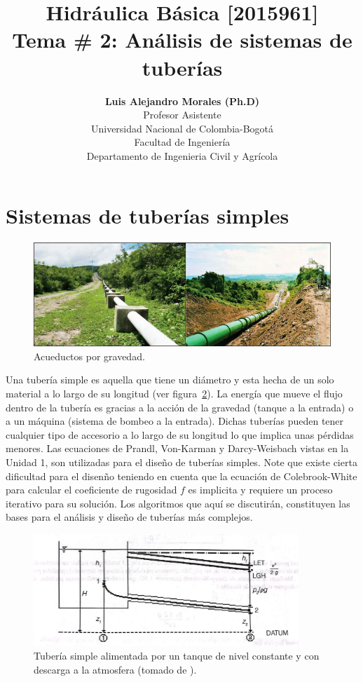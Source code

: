\documentclass[10pt, oneside]{article}
\title{Hidr\'aulica B\'asica [2015961] \\ \textbf{Tema \# 2: An\'alisis de sistemas de tuber\'ias}}
\author{\textbf{Luis Alejandro Morales (Ph.D)}\\ \vspace{0.4cm} Profesor Asistente \\ Universidad Nacional de Colombia-Bogot\'a\\Facultad de Ingenier\'ia \\ Departamento de Ingenieria Civil y Agr\'icola}
\date{}
\begin{document}
\maketitle
\tableofcontents


\section{Sistemas de tuber\'ias simples} \label{tubs}

\begin{figure}[h]
\centering
\includegraphics[width=12cm]{./figs/simpTub.png}
\caption{Acueductos por gravedad.} 
\label{simpTub}
\end{figure}


Una tuber\'ia simple es aquella que tiene un di\'ametro y esta hecha de un solo material a lo largo de su longitud (ver figura~\ref{ttub}). La energ\'ia que mueve el flujo dentro de la tuber\'ia es gracias a la acci\'on de la gravedad (tanque a la entrada) o a un m\'aquina (sistema de bombeo a la entrada). Dichas tuber\'ias pueden tener cualquier tipo de accesorio a lo largo de su longitud lo que implica unas p\'erdidas menores. Las ecuaciones de Prandl, Von-Karman y Darcy-Weisbach vistas en la Unidad 1, son utilizadas para el dise\~no de tuber\'ias simples. Note que existe cierta dificultad para el disen\~no teniendo en cuenta que la ecuaci\'on de Colebrook-White para calcular el coeficiente de rugosidad $f$ es implicita y requiere un proceso iterativo para su soluci\'on. Los algoritmos que aqu\'i se discutir\'an, constituyen las bases para el an\'alisis y dise\~no de tuber\'ias m\'as complejos. 

\begin{figure}[h]
\centering
\includegraphics[width=10cm]{./figs/ttub.jpeg}
\caption{Tuber\'ia simple alimentada por un tanque de nivel constante y con descarga a la atmosfera (tomado de \cite{saldarriaga}).} 
\label{ttub}
\end{figure}
\end{document}
